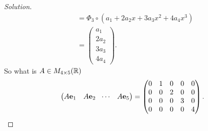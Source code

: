\documentclass[10pt, a4paper]{article}
\begin{document}
\begin{example}
\begin{proof}[Solution]
\begin{align*}
            &= \Phi_3 \circ (a_1 + 2a_2x + 3a_3x ^ 2 + 4a_4x ^ 3) \\
            &= \begin{pmatrix}
                a_1 \\ 2a_2 \\ 3a_3 \\ 4a_4
            \end{pmatrix}.
        \end{align*}
        So what is $A \in M_{4 \times 5}(\mathbb{R})$
        \[
        \begin{pmatrix}
            A\mathbf{e}_1 & A\mathbf{e}_2 & \dotsi & A\mathbf{e}_5
        \end{pmatrix} =
        \begin{pmatrix}
            0 & 1 & 0 & 0 & 0 \\
            0 & 0 & 2 & 0 & 0 \\
            0 & 0 & 0 & 3 & 0 \\
            0 & 0 & 0 & 0 & 4
        \end{pmatrix}.
        \]
    \end{proof}
\end{example}
\end{document}

